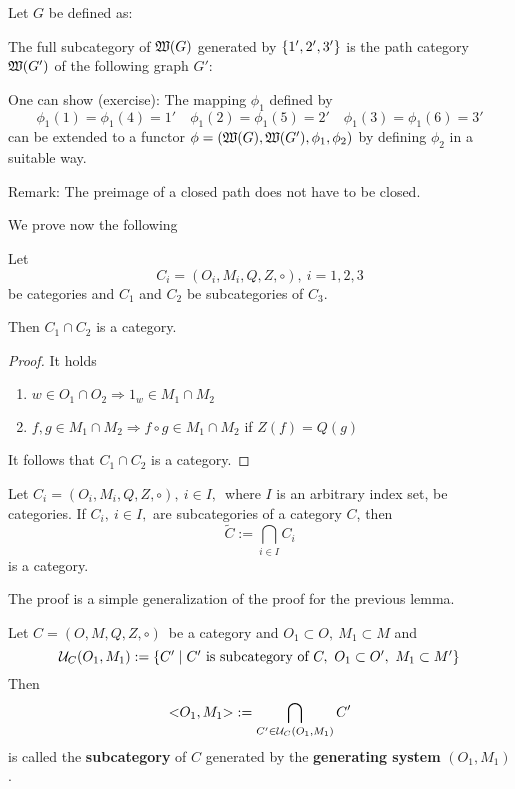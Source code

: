 \bigskip
\begin{example}
Let $G$ be defined as:

\begin{center}

\end{center}

The full subcategory of $\mbox{$\mathfrak{W}({G})$}$ generated by $\mbox{$\{1', 2', 3'\}$}$ is the
path category $\mbox{$\mathfrak{W}({G'})$}$ of the following graph $G'$:

\begin{center}

\end{center}

One can show (exercise): The mapping $\phi_1$ defined by 
\[ \phi_1(1) = \phi_1(4) = 1' \quad \phi_1(2) = \phi_1(5) = 2'
 \quad \phi_1(3) = \phi_1(6) = 3' \]
can be extended to a functor $\phi = (\mbox{$\mathfrak{W}({G})$}, \mbox{$\mathfrak{W}({G'})$}, \phi_1,
\phi_2)$ by defining $\phi_2$ in a suitable way.
\end{example}

Remark: The preimage of a closed path does not have to be closed.

We prove now the following
\begin{lemma}
Let \[ C_i = (O_i, M_i, Q, Z, \circ),\ i = 1, 2, 3 \] be categories and $C_1$
and $C_2$ be subcategories of $C_3$. 

Then $C_1 \cap C_2$ is a category.
\end{lemma}

\begin{proof}
It holds
\begin{enumerate}
  \item $w \in O_1 \cap O_2 \Rightarrow 1_w \in M_1 \cap M_2$
  \item $f, g \in M_1 \cap M_2 \Rightarrow f \circ g \in M_1 \cap M_2$ if
  $Z(f) = Q(g)$
\end{enumerate}
It follows that $C_1 \cap C_2$ is a category.
\end{proof}

\bigskip
\begin{lemma}
Let $ C_i = (O_i, M_i, Q, Z, \circ),\ i \in I,$\ where $I$ is an arbitrary
index set, be categories. If $C_i,\ i \in I,$ are subcategories of a category
$C$, then 
\[ \tilde{C} := \bigcap_{i \in I} C_i \] 
is a category.
\end{lemma}
The proof is a simple generalization of the proof for the previous lemma.

\bigskip
\begin{definition}
Let $C = (O, M, Q, Z, \circ)$\ be a category and $O_1 \subset O,\ M_1 \subset M$
and 
\[ \mathcal{U}_C(O_1, M_1) := \mbox{$\{C' \mid C'\text{ is subcategory of }C,\
O_1 \subset O',\ M_1 \subset M'\}$} \]
Then
\[ \mbox{${<}{O_1},{M_1}{>}$} := \bigcap_{C' \in \mathcal{U}_C(O_1, M_1)} C' \]
is called the {\bf subcategory} of $C$ generated by the {\bf generating system}
$(O_1, M_1)$.
\end{definition}


